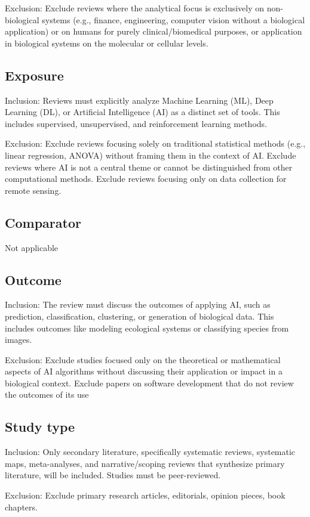 \documentclass{article}
\begin{document}
Exclusion: Exclude reviews where the analytical focus is exclusively on non-biological systems (e.g., finance, engineering, computer vision without a biological application) or on humans for purely clinical/biomedical purposes, or application in biological systems on the molecular or cellular levels.

\subsection{Exposure}
Inclusion: Reviews must explicitly analyze Machine Learning (ML), Deep Learning (DL), or Artificial Intelligence (AI) as a distinct set of tools. This includes supervised, unsupervised, and reinforcement learning methods.

Exclusion: Exclude reviews focusing solely on traditional statistical methods (e.g., linear regression, ANOVA) without framing them in the context of AI. Exclude reviews where AI is not a central theme or cannot be distinguished from other computational methods. Exclude reviews focusing only on data collection for remote sensing.

\subsection{Comparator}
Not applicable

\subsection{Outcome}
Inclusion: The review must discuss the outcomes of applying AI, such as prediction, classification, clustering, or generation of biological data. This includes outcomes like modeling ecological systems or classifying species from images.

Exclusion: Exclude studies focused only on the theoretical or mathematical aspects of AI algorithms without discussing their application or impact in a biological context. Exclude papers on software development that do not review the outcomes of its use

\subsection{Study type}
Inclusion: Only secondary literature, specifically systematic reviews, systematic maps, meta-analyses, and narrative/scoping reviews that synthesize primary literature, will be included. Studies must be peer-reviewed.

Exclusion: Exclude primary research articles, editorials, opinion pieces, book chapters.
\end{document}

